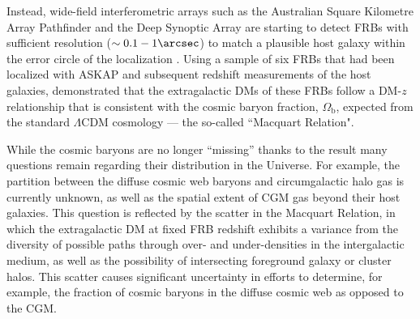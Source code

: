 \documentclass[twocolumn]{aastex63}
\begin{document}
\begin{CJK*}{UTF8}{gbsn}
 
 
 
 Instead, wide-field interferometric arrays such as the Australian Square Kilometre Array Pathfinder \citep[ASKAP;][]{mcconnell:2016,shannon:2018} and 
 the Deep Synoptic Array \citep[DSA;][]{kocz:2019} are starting to detect FRBs with sufficient resolution ($\sim 0.1 -1 \arcsec$) to match
  a plausible host galaxy within the error circle of the localization \citep[e.g.,][]{bannister:2019,bhandari:2020,ravi:2019a}. Using a sample
  of six FRBs that had been localized with ASKAP and subsequent redshift measurements of the host galaxies, \citet{macquart:2020} 
  demonstrated that the extragalactic DMs of these FRBs follow a DM-$z$ relationship that is consistent with the cosmic baryon fraction, $\Omega_\mathrm{b}$,
  expected from the standard $\Lambda$CDM cosmology --- the so-called ``Macquart Relation".
 
While the cosmic baryons are no longer ``missing'' thanks to the \citet{macquart:2020} result 
\citep[complemented by techniques
probing denser gas, e.g.][]{werk:2014,nicastro:2018}
many questions remain regarding their distribution in the Universe. For example, the partition between
the diffuse cosmic web baryons and circumgalactic halo gas is currently unknown, 
as well as the spatial extent of CGM gas beyond their host galaxies. 
This question is reflected by the scatter in the Macquart Relation, 
in which the extragalactic DM at fixed FRB redshift exhibits
a variance from the diversity of possible paths through over- and under-densities in the intergalactic medium, as well as the possibility of
intersecting foreground galaxy or cluster halos. This scatter causes significant uncertainty in efforts to determine, for example, the fraction of cosmic 
baryons in the diffuse cosmic web as opposed to the CGM.


\end{CJK*}
\end{document}
